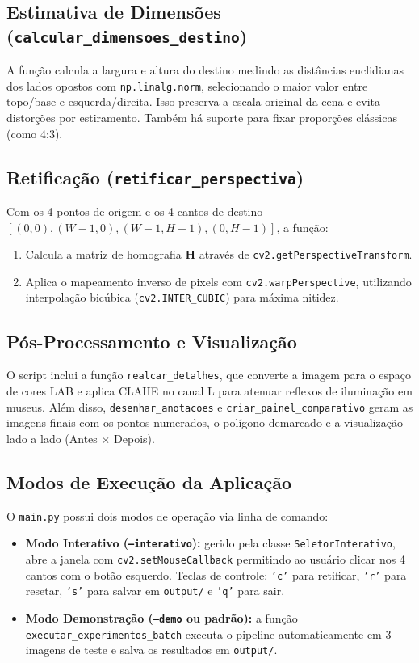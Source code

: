 \documentclass[twocolumn]{article}
\begin{document}
\subsection{Estimativa de Dimensões (\texttt{calcular\_dimensoes\_destino})}
A função calcula a largura e altura do destino medindo as distâncias euclidianas dos lados opostos com \texttt{np.linalg.norm}, selecionando o maior valor entre topo/base e esquerda/direita. Isso preserva a escala original da cena e evita distorções por estiramento. Também há suporte para fixar proporções clássicas (como 4:3).

\subsection{Retificação (\texttt{retificar\_perspectiva})}
Com os 4 pontos de origem e os 4 cantos de destino $[(0,0), (W-1, 0), (W-1, H-1), (0, H-1)]$, a função:
\begin{enumerate}
    \item Calcula a matriz de homografia $\mathbf{H}$ através de \texttt{cv2.getPerspectiveTransform}.
    \item Aplica o mapeamento inverso de pixels com \texttt{cv2.warpPerspective}, utilizando interpolação bicúbica (\texttt{cv2.INTER\_CUBIC}) para máxima nitidez.
\end{enumerate}

\subsection{Pós-Processamento e Visualização}
O script inclui a função \texttt{realcar\_detalhes}, que converte a imagem para o espaço de cores LAB e aplica CLAHE no canal L para atenuar reflexos de iluminação em museus. Além disso, \texttt{desenhar\_anotacoes} e \texttt{criar\_painel\_comparativo} geram as imagens finais com os pontos numerados, o polígono demarcado e a visualização lado a lado (Antes $\times$ Depois).

\subsection{Modos de Execução da Aplicação}
O \texttt{main.py} possui dois modos de operação via linha de comando:
\begin{itemize}
    \item \textbf{Modo Interativo (\texttt{--interativo}):} gerido pela classe \texttt{SeletorInterativo}, abre a janela com \texttt{cv2.setMouseCallback} permitindo ao usuário clicar nos 4 cantos com o botão esquerdo. Teclas de controle: \texttt{'c'} para retificar, \texttt{'r'} para resetar, \texttt{'s'} para salvar em \texttt{output/} e \texttt{'q'} para sair.
    \item \textbf{Modo Demonstração (\texttt{--demo} ou padrão):} a função \texttt{executar\_experimentos\_batch} executa o pipeline automaticamente em 3 imagens de teste e salva os resultados em \texttt{output/}.
\end{itemize}
\end{document}
